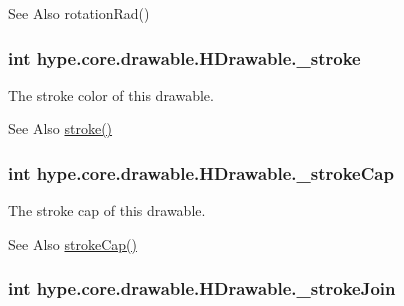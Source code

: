 \begin{DoxySeeAlso}{See Also}
rotation\-Rad() 
\end{DoxySeeAlso}
\hypertarget{classhype_1_1core_1_1drawable_1_1_h_drawable_aa773c8e474774a4f4b6437f77abdc85b}{
\subsubsection[{\-\_\-stroke}]{\setlength{\rightskip}{0pt plus 5cm}int hype.\-core.\-drawable.\-H\-Drawable.\-\_\-stroke\hspace{0.3cm}{\ttfamily [protected]}}}\label{classhype_1_1core_1_1drawable_1_1_h_drawable_aa773c8e474774a4f4b6437f77abdc85b}


The stroke color of this drawable. 

\begin{DoxySeeAlso}{See Also}
\hyperlink{classhype_1_1core_1_1drawable_1_1_h_drawable_aeef1c190f383562910107be8e5f80461}{stroke()} 
\end{DoxySeeAlso}
\hypertarget{classhype_1_1core_1_1drawable_1_1_h_drawable_a35be29f7a889fada5549c5dfcaa98d7d}{
\subsubsection[{\-\_\-stroke\-Cap}]{\setlength{\rightskip}{0pt plus 5cm}int hype.\-core.\-drawable.\-H\-Drawable.\-\_\-stroke\-Cap\hspace{0.3cm}{\ttfamily [protected]}}}\label{classhype_1_1core_1_1drawable_1_1_h_drawable_a35be29f7a889fada5549c5dfcaa98d7d}


The stroke cap of this drawable. 

\begin{DoxySeeAlso}{See Also}
\hyperlink{classhype_1_1core_1_1drawable_1_1_h_drawable_ab9838a263f6daf6cc85f4fc7f7e038e2}{stroke\-Cap()} 
\end{DoxySeeAlso}
\hypertarget{classhype_1_1core_1_1drawable_1_1_h_drawable_a3b021f60cc0552c6d1c5d4e298419dec}{
\subsubsection[{\-\_\-stroke\-Join}]{\setlength{\rightskip}{0pt plus 5cm}int hype.\-core.\-drawable.\-H\-Drawable.\-\_\-stroke\-Join\hspace{0.3cm}{\ttfamily [protected]}}}\label{classhype_1_1core_1_1drawable_1_1_h_drawable_a3b021f60cc0552c6d1c5d4e298419dec}


